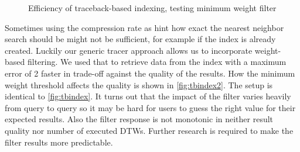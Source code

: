 \begin{figure}
    \centering
    
    \caption{Efficiency of traceback-based indexing, testing minimum weight filter}
    \label{fig:tbindex2}
\end{figure}

Sometimes using the compression rate as hint how exact the nearest neighbor search should be might not be sufficient, for example if the index is already created. Luckily our generic tracer approach allows us to incorporate weight-based filtering. We used that to retrieve data from the index with a maximum error of \num{2} faster in trade-off against the quality of the results. How the minimum weight threshold affects the quality is shown in \autoref{fig:tbindex2}. The setup is identical to \autoref{fig:tbindex}. It turns out that the impact of the filter varies heavily from query to query so it may be hard for users to guess the right value for their expected results. Also the filter response is not monotonic in neither result quality nor number of executed DTWs. Further research is required to make the filter results more predictable.
